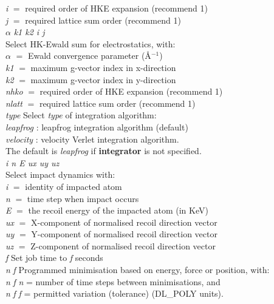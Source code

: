 \begin{tabbing}
\> \> {\em i} $=$ required order of HKE expansion (recommend 1)\\
\> \> {\em j} $=$ required lattice sum order (recommend 1)\\
  $\alpha$ {\em k1 k2 i j} \\
\> \> Select HK-Ewald sum for electrostatics, with:\\
\> \> $\alpha$ $=$ Ewald convergence parameter (\AA$^{-1}$)\\
\> \> {\em k1} $=$ maximum g-vector index in x-direction\\
\> \> {\em k2} $=$ maximum g-vector index in y-direction\\
\> \> {\em nhko} $=$ required order of HKE expansion (recommend 1)\\
\> \> {\em nlatt} $=$ required lattice sum order (recommend 1)\\
 {\em type}\> Select {\em type} of integration algorithm:\\
\> \> {\em leapfrog} : leapfrog integration algorithm (default)\\
\> \> {\em velocity} : velocity Verlet integration algorithm. \\
\> \> The default is {\em leapfrog} if {\bf integrator} is not specified.\\
 {\em i n E ux uy uz}\> \\
\> \> Select impact dynamics with: \\
\> \> {\em i} $=$ identity of impacted atom \\
\> \> {\em n} $=$ time step when impact occurs \\
\> \> {\em E} $=$ the recoil energy of the impacted atom (in KeV)\\
\> \> {\em ux} $=$ X-component of normalised recoil direction vector \\
\> \> {\em uy} $=$ Y-component of normalised recoil direction vector \\
\> \> {\em uz} $=$ Z-component of normalised recoil direction vector \\
 {\em f}\> Set job time to {\em f} seconds \\
 {\em n} {\em f} \> Programmed minimisation based on
energy, force or position, with: \\
 {\em n} {\em f} \> {\em n} = number of time steps between minimisations, and\\
 {\em n} {\em f} \> {\em f} = permitted variation
(tolerance) (DL\_POLY units).\\

\end{tabbing}

